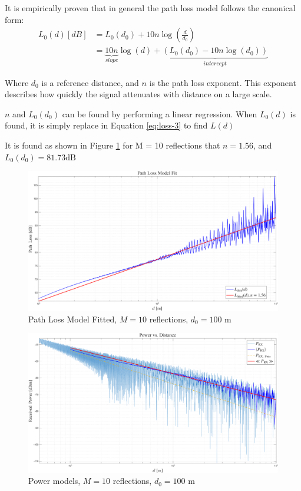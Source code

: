 It is empirically proven that in general the path loss model follows the canonical form:
\begin{align}
	L_{0}(d) [dB] &= L_0(d_0) + 10n \log\left(\frac{d}{d_0}\right)\\
				&= \underbrace{10n}_{slope} \log(d) + \underbrace{(L_0(d_0) - 10n \log(d_0))}_{intercept} \label{eq:lin-reg}
\end{align}


Where $d_0$ is a reference distance, and $n$ is the path loss exponent. This exponent describes how quickly the signal attenuates with distance on a large scale.

$n$ and $L_0(d_0)$ can be found by performing a linear regression. When $L_0(d)$ is found, it is simply replace in Equation \ref{eq:loss-3} to find $L(d)$

It is found as shown in Figure \ref{fig:path-loss-model-fit-m10} for M = 10 reflections that $n = 1.56$, and $L_0(d_0) = 81.73 \mathrm{dB}$
\begin{figure}[H]
	\centering
	\includegraphics[width=1\linewidth]{"content/4-images/Path Loss Model Fit M=10"}
	\caption{Path Loss Model Fitted, $M = 10$ reflections, $d_0 = 100$ m}
	\label{fig:path-loss-model-fit-m10}
\end{figure}


\begin{figure}
	\centering
	\includegraphics[width=\linewidth]{"content/4-images/Instantaneous vs average M=10"}
	\caption{Power models, $M = 10$ reflections, $d_0 = 100$ m}
	\label{fig:instantaneous-vs-average-m10}
\end{figure}







